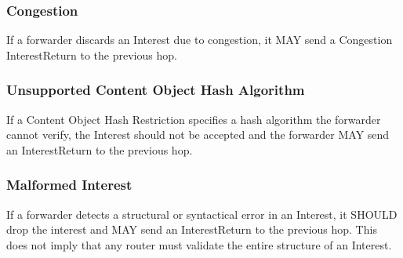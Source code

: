\documentclass[12pt]{report}
\begin{document}
\subsubsection{Congestion}
If a forwarder discards an Interest due to congestion, it MAY send a
Congestion InterestReturn to the previous hop.

\subsubsection{Unsupported Content Object Hash Algorithm}
If a Content Object Hash Restriction specifies a hash algorithm the
forwarder cannot verify, the Interest should not be accepted and the
forwarder MAY send an InterestReturn to the previous hop.

\subsubsection{Malformed Interest}
If a forwarder detects a structural or syntactical error in an
Interest, it SHOULD drop the interest and MAY send an InterestReturn
to the previous hop.  This does not imply that any router must
validate the entire structure of an Interest.




\end{document}
